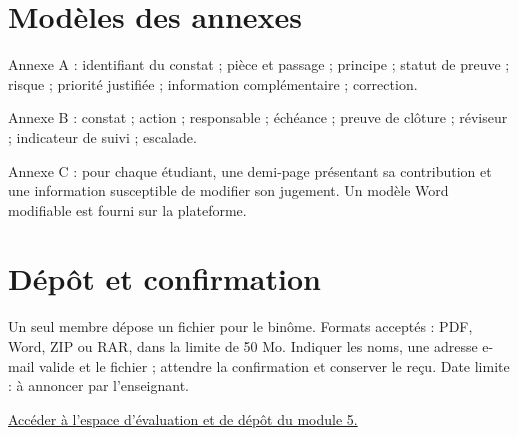 \documentclass[11pt,a4paper]{article}
\begin{document}
\section{Modèles des annexes}
Annexe A : identifiant du constat ; pièce et passage ; principe ; statut de preuve ; risque ; priorité justifiée ; information complémentaire ; correction.

Annexe B : constat ; action ; responsable ; échéance ; preuve de clôture ; réviseur ; indicateur de suivi ; escalade.

Annexe C : pour chaque étudiant, une demi-page présentant sa contribution et une information susceptible de modifier son jugement. Un modèle Word modifiable est fourni sur la plateforme.

\section{Dépôt et confirmation}
Un seul membre dépose un fichier pour le binôme. Formats acceptés : PDF, Word, ZIP ou RAR, dans la limite de 50 Mo. Indiquer les noms, une adresse e-mail valide et le fichier ; attendre la confirmation et conserver le reçu. Date limite : à annoncer par l’enseignant.

\href{https://aboufarasse.github.io/Finance-Verte-Gouvernance-Conformite/evaluation-finale/}{Accéder à l’espace d’évaluation et de dépôt du module 5.}
\end{document}
